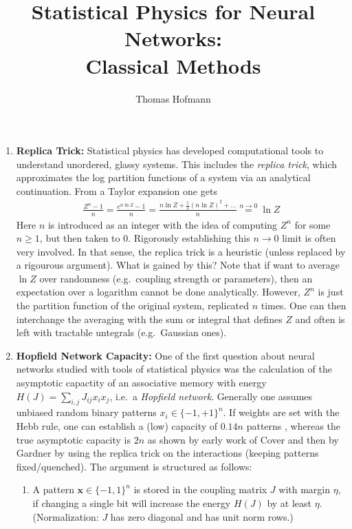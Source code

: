 \documentclass[10pt,a4pape]{article}
\author{Thomas Hofmann}
\title{Statistical Physics for Neural Networks: \\[2mm] Classical Methods}
\newcommand{\x}{{\mathbf x}}
\begin{document}
\maketitle

\begin{enumerate}
\item{\textbf{Replica Trick: }} Statistical physics has developed computational tools to understand unordered, glassy systems. This  includes the \textit{replica trick}, which approximates the log partition functions of a system via an analytical continuation. From a Taylor expansion one gets 
\begin{align}
\frac{Z^n -1}{n} = \frac{e^{n \ln Z}-1}{n} = \frac{n \ln Z + \frac 12 (n \ln Z)^2 + ...}{n}  \stackrel{n \to 0}= \ln Z
\end{align}
Here $n$ is introduced as an integer with the idea of computing $Z^n$ for some $n \ge 1$, but then taken to $0$. Rigorously establishing this $n \to 0$ limit is often very involved. In that sense, the replica trick is a heuristic (unless replaced by a rigourous argument). What is gained by this? Note that if want to average $\ln Z$ over randomness (e.g.~coupling strength or parameters), then an expectation over a logarithm cannot be done analytically. However, $Z^n$ is just the partition function of the original system, replicated $n$ times. One can then interchange the averaging with the sum or integral that defines $Z$ and often is left with tractable untegrals (e.g.~Gaussian ones).
%
\item{\textbf{Hopfield Network Capacity:}} One of the first question about neural networks studied with tools of statistical physics was the calculation of the asymptotic capactity of an associative memory with energy $H(J) = \sum_{i,j} J_{ij} x_i x_j$, i.e.~a \textit{Hopfield network}. Generally one assumes unbiased random binary patterns $x_i \in \{-1,+1\}^n$. If weights are set with the Hebb rule, one can establish a (low) capacity of $0.14n$ patterns \cite{amit1985storing}, whereas the true asymptotic capacity is $2n$ as shown by early work of Cover \cite{cover1965} and then by Gardner \cite{gardner1987maximum} by using the replica trick on the interactions (keeping patterns fixed/quenched). The argument  is structured as follows:
\begin{enumerate} 
\item A pattern $\x \in \{-1,1\}^n$ is stored in the coupling matrix $J$ with margin $\eta$, if changing a single bit will increase the energy $H(J)$ by at least $\eta$. (Normalization: $J$ has zero diagonal and has unit norm rows.)

\end{enumerate}
\end{enumerate}
\end{document}
